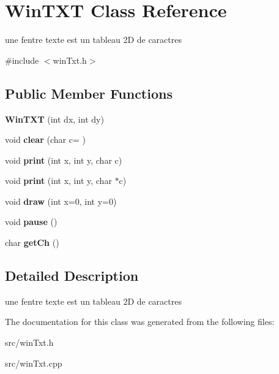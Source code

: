\hypertarget{classWinTXT}{}\section{Win\+T\+XT Class Reference}
\label{classWinTXT}


une fentre texte est un tableau 2D de caractres  




{\ttfamily \#include $<$win\+Txt.\+h$>$}

\subsection*{Public Member Functions}
\begin{DoxyCompactItemize}
\item 
\mbox{\label{classWinTXT_ad471ddd48d2a7c43acccd1204e419527}} 
{\bfseries Win\+T\+XT} (int dx, int dy)
\item 
\mbox{\label{classWinTXT_a1b4cb203533f78bed29498591631f436}} 
void {\bfseries clear} (char c=\textquotesingle{} \textquotesingle{})
\item 
\mbox{\label{classWinTXT_a407cce45e7f81546540f4f8a9b85ce45}} 
void {\bfseries print} (int x, int y, char c)
\item 
\mbox{\label{classWinTXT_ad021d5fb9862b9ea7985f8cef50451e2}} 
void {\bfseries print} (int x, int y, char $\ast$c)
\item 
\mbox{\label{classWinTXT_af83a18827593465fc397983c97b4e886}} 
void {\bfseries draw} (int x=0, int y=0)
\item 
\mbox{\label{classWinTXT_a3e8793fd263bb51a62ec8a5e89904c49}} 
void {\bfseries pause} ()
\item 
\mbox{\label{classWinTXT_a418c66475403586ac57a80eceb409166}} 
char {\bfseries get\+Ch} ()
\end{DoxyCompactItemize}


\subsection{Detailed Description}
une fentre texte est un tableau 2D de caractres 

The documentation for this class was generated from the following files\+:\begin{DoxyCompactItemize}
\item 
src/win\+Txt.\+h\item 
src/win\+Txt.\+cpp\end{DoxyCompactItemize}
